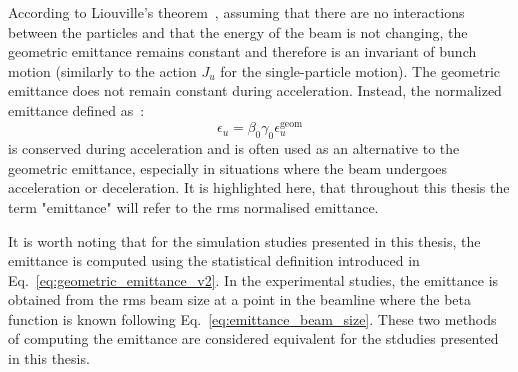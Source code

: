  
 
 According to Liouville’s theorem~\cite{wolski2014}, assuming that there are no interactions between the particles and that the energy of the beam is not changing, the geometric emittance remains constant and therefore is an invariant of bunch motion (similarly to the action $J_u$ for the single-particle motion). The geometric emittance does not remain constant during acceleration. Instead, the normalized emittance defined as~\cite{wolski2014}:
 \begin{equation}\label{eq:normalised_emittance}
     \epsilon_u = \beta_0 \gamma_0 \epsilon^{\mathrm{geom}}_u
 \end{equation}
is conserved during acceleration and is often used as an alternative to the geometric emittance, especially in situations where the beam undergoes acceleration or deceleration. It is highlighted here, that throughout this thesis the term "emittance" will refer to the rms normalised emittance.
 
 It is worth noting that for the simulation studies presented in this thesis, the emittance is computed using the statistical definition introduced in Eq.~\eqref{eq:geometric_emittance_v2}. In the experimental studies, the emittance is obtained from the rms beam size at a point in the beamline where the beta function is known following Eq.~\eqref{eq:emittance_beam_size}. These two methods of computing the emittance are considered equivalent for the stdudies presented in this thesis.
 
 
